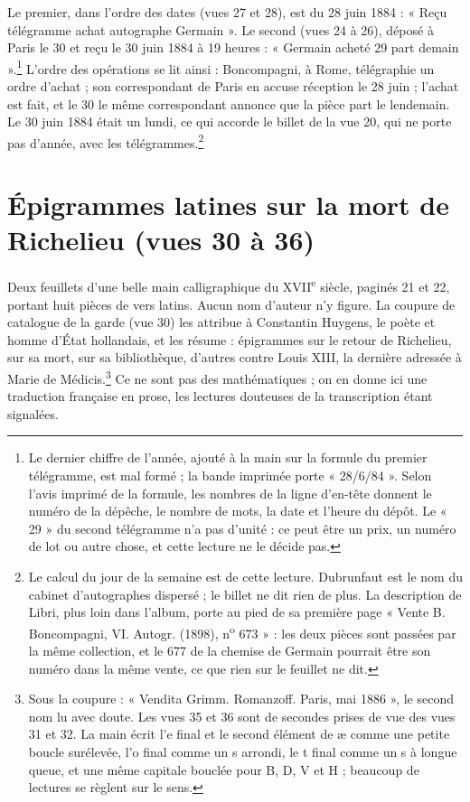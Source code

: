 \documentclass[11pt,a4paper]{article}
\begin{document}
Le premier, dans l'ordre des dates (vues 27 et 28), est du 28 juin 1884 :
« Reçu télégramme achat autographe Germain ». Le second (vues 24 à 26),
déposé à Paris le 30 et reçu le 30 juin 1884 à 19 heures : « Germain acheté
29 part demain ».\footnote{Le dernier chiffre de l'année, ajouté à la main
sur la formule du premier télégramme, est mal formé ; la bande imprimée porte
« 28/6/84 ». Selon l'avis imprimé de la formule, les nombres de la ligne
d'en-tête donnent le numéro de la dépêche, le nombre de mots, la date et
l'heure du dépôt. Le « 29 » du second télégramme n'a pas d'unité : ce peut
être un prix, un numéro de lot ou autre chose, et cette lecture ne le décide
pas.} L'ordre des opérations se lit ainsi : Boncompagni, à Rome, télégraphie
un ordre d'achat ; son correspondant de Paris en accuse réception le 28 juin ;
l'achat est fait, et le 30 le même correspondant annonce que la pièce part
le lendemain. Le 30 juin 1884 était un lundi, ce qui accorde le billet de la
vue 20, qui ne porte pas d'année, avec les télégrammes.\footnote{Le calcul du
jour de la semaine est de cette lecture. Dubrunfaut est le nom du cabinet
d'autographes dispersé ; le billet ne dit rien de plus. La description de
Libri, plus loin dans l'album, porte au pied de sa première page « Vente
B. Boncompagni, VI. Autogr. (1898), n\textsuperscript{o} 673 » : les deux
pièces sont passées par la même collection, et le 677 de la chemise de
Germain pourrait être son numéro dans la même vente, ce que rien sur le
feuillet ne dit.}

\section*{Épigrammes latines sur la mort de Richelieu (vues 30 à 36)}

Deux feuillets d'une belle main calligraphique du XVII\textsuperscript{e}
siècle, paginés 21 et 22, portant huit pièces de vers latins. Aucun nom
d'auteur n'y figure. La coupure de catalogue de la garde (vue 30) les
attribue à Constantin Huygens, le poète et homme d'État hollandais, et les
résume : épigrammes sur le retour de Richelieu, sur sa mort, sur sa
bibliothèque, d'autres contre Louis XIII, la dernière adressée à Marie de
Médicis.\footnote{Sous la coupure : « Vendita Grimm. Romanzoff. Paris, mai
1886 », le second nom lu avec doute. Les vues 35 et 36 sont de secondes prises
de vue des vues 31 et 32. La main écrit l'e final et le second élément de æ
comme une petite boucle surélevée, l'o final comme un s arrondi, le t final
comme un s à longue queue, et une même capitale bouclée pour B, D, V et H ;
beaucoup de lectures se règlent sur le sens.} Ce ne sont pas des
mathématiques ; on en donne ici une traduction française en prose, les
lectures douteuses de la transcription étant signalées.
\end{document}
